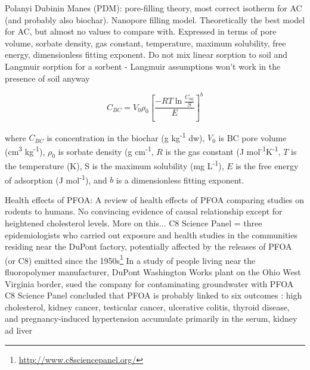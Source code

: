 Polanyi Dubinin Manes (PDM): pore-filling theory, most correct isotherm for AC (and probably also biochar). Nanopore filling model. Theoretically the best model for AC, but almost no values to compare with. Expressed in terms of pore volume, sorbate density, gas constant, temperature, maximum solubility, free energy, dimensionless fitting exponent. 
Do not mix linear sorption to soil and Langmuir sorption for a sorbent - Langmuir assumptions won't work in the presence of soil anyway

\begin{equation} \label{eq:PDM}
    C_{BC} = V_0\rho_0 \left [ \frac{-RT\ln \frac{C_{aq}}{S}}{E}\right ]^b
\end{equation}


where $C_{BC}$ is concentration in the biochar (g kg\textsuperscript{-1} dw), $V_0$ is BC pore volume (cm\textsuperscript{3} kg\textsuperscript{-1}), $\rho_0$ is sorbate density (g cm\textsuperscript{-1}, $R$ is the gas constant (J mol\textsuperscript{-1}K\textsuperscript{-1}, $T$ is the temperature (K), S is the maximum solubility (mg L\textsuperscript{-1}), $E$ is the free energy of adsorption (J mol\textsuperscript{-1}), and $b$ is a dimensionless fitting exponent. 

Health effects of PFOA: \citep{Steenland2010} A review of health effects of PFOA comparing studies on rodents to humans. No convincing evidence of causal relationship except for heightened cholesterol levels. More on this... 
C8 Science Panel = three epidemiologists who carried out exposure and health studies in the communities residing near the DuPont factory, potentially affected by the releases of PFOA (or C8) emitted since the 1950s\footnote{\url{http://www.c8sciencepanel.org/}}
In a study of people living near the fluoropolymer manufacturer, DuPont Washington Works plant on the Ohio West Virginia border, sued the company for contaminating groundwater with PFOA C8 Science Panel  concluded that PFOA is probably linked to six outcomes : high cholesterol, kidney cancer, testicular cancer, ulcerative colitis, thyroid disease, and pregnancy-induced hypertension 
accumulate primarily in the serum, kidney ad liver \citep{EPA2014}